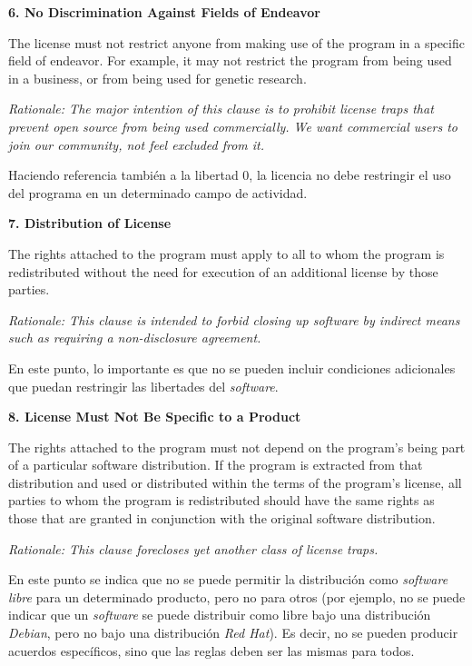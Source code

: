 {\bf 6. No Discrimination Against Fields of Endeavor

The license must not restrict anyone from making use of the program in a
specific field of endeavor. For example, it may not restrict the program from
being used in a business, or from being used for genetic research.}

\textit{Rationale: The major intention of this clause is to prohibit license
traps that prevent open source from being used commercially. We want commercial
users to join our community, not feel excluded from it.}\vspace{0.4cm}

Haciendo referencia también a la libertad 0, la licencia no debe restringir el
uso del programa en un determinado campo de actividad.\vspace{0.4cm}

{\bf 7. Distribution of License

The rights attached to the program must apply to all to whom the program is
redistributed without the need for execution of an additional license by those
parties.}

\textit{Rationale: This clause is intended to forbid closing up software by
indirect means such as requiring a non-disclosure agreement.}\vspace{0.4cm}

En este punto, lo importante es que no se pueden incluir condiciones adicionales
que puedan restringir las libertades del \textit{software}.\vspace{0.4cm}

{\bf 8. License Must Not Be Specific to a Product

The rights attached to the program must not depend on the program's being part
of a particular software distribution. If the program is extracted from that
distribution and used or distributed within the terms of the program's license,
all parties to whom the program is redistributed should have the same rights as
those that are granted in conjunction with the original software distribution.}

\textit{Rationale: This clause forecloses yet another class of license
traps.}\vspace{0.4cm}

En este punto se indica que no se puede permitir la distribución como
\textit{software libre} para un determinado producto, pero no para otros (por
ejemplo, no se puede indicar que un \textit{software} se puede distribuir como
libre bajo una distribución \textit{Debian}, pero no bajo una distribución
\textit{Red Hat}). Es decir, no se pueden producir acuerdos específicos, sino
que las reglas deben ser las mismas para todos.\vspace{0.4cm}

